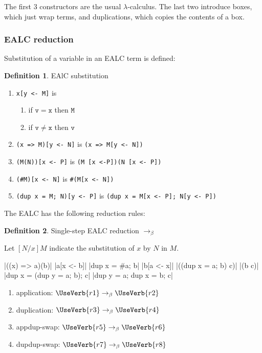 \documentclass{article}
\theoremstyle{definition}
\newtheorem{definition}{Definition}
\theoremstyle{theorem}
\newcommand\rab{\rightarrow_{\beta}}
\newcommand\code{\mathtt}
\newcommand\SV{\SaveVerb}
\newcommand\UV{\UseVerb}
\begin{document}
The first 3 constructors are the usual $\lambda$-calculus. The last two
introduce boxes, which just wrap terms, and duplications, which copies the
contents of a box.

\subsubsection{EALC reduction}

Substitution of a variable in an EALC term is defined:
\begin{definition} EAlC substitution
  \begin{enumerate}
    \item \verb|x[y <- M]| is
      \begin{enumerate}
        \item if $\code{v} = \code{x}$ then $\code{M}$
        \item if $\code{v} \neq \code{x}$ then $\code{v}$
      \end{enumerate}
    \item \verb|(x => M)[y <- N]| is \verb|(x => M[y <- N])|
    \item \verb|(M(N))[x <- P]| is \verb|(M [x <-P])(N [x <- P])|
    \item \verb|(#M)[x <- N]| is \verb|#(M[x <- N])|
    \item \verb|(dup x = M; N)[y <- P]| is
          \verb|(dup x = M[x <- P]; N[y <- P])|
  \end{enumerate}
\end{definition}

The EALC has the following reduction rules:

\begin{definition} Single-step EALC reduction $\rab$

Let $[N/x]M$ indicate the substitution of $x$ by $N$ in $M$.

\SV{r1}|((x) => a)(b)|
\SV{r2}|a[x <- b]|
\SV{r3}|dup x = #a; b|
\SV{r4}|b[a <- x]|
\SV{r5}|((dup x = a; b) c)|
\SV{r6}|(b c)|
\SV{r7}|dup x = (dup y = a; b); c|
\SV{r8}|dup y = a; dup x = b; c|
\begin{enumerate}
\item application: $\UV{r1} \rab \UV{r2}$
\item duplication: $\UV{r3} \rab \UV{r4}$
\item appdup-swap: $\UV{r5} \rab \UV{r6}$
\item dupdup-swap: $\UV{r7} \rab \UV{r8}$
\end{enumerate}
\end{definition}
\end{document}
